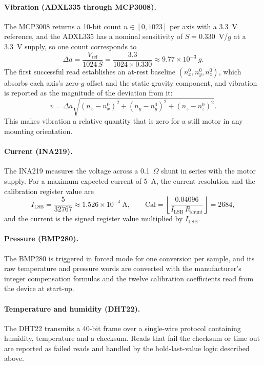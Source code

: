 \paragraph{Vibration (ADXL335 through MCP3008).} The MCP3008 returns a 10-bit count $n \in [0, 1023]$ per axis with a 3.3~V reference, and the ADXL335 has a nominal sensitivity of $S = 0.330$~V/$g$ at a 3.3~V supply, so one count corresponds to
\begin{equation}
\Delta a = \frac{V_{\mathrm{ref}}}{1024\, S} = \frac{3.3}{1024 \times 0.330} \approx 9.77 \times 10^{-3}~g.
\end{equation}
The first successful read establishes an at-rest baseline $(n_x^0, n_y^0, n_z^0)$, which absorbs each axis's zero-$g$ offset and the static gravity component, and vibration is reported as the magnitude of the deviation from it:
\begin{equation}
v = \Delta a \sqrt{(n_x - n_x^0)^2 + (n_y - n_y^0)^2 + (n_z - n_z^0)^2}.
\end{equation}
This makes vibration a relative quantity that is zero for a still motor in any mounting orientation.

\paragraph{Current (INA219).} The INA219 measures the voltage across a 0.1~$\Omega$ shunt in series with the motor supply. For a maximum expected current of 5~A, the current resolution and the calibration register value are
\begin{equation}
I_{\mathrm{LSB}} = \frac{5}{32767} \approx 1.526 \times 10^{-4}~\mathrm{A}, \qquad
\mathrm{Cal} = \left\lfloor \frac{0.04096}{I_{\mathrm{LSB}}\, R_{\mathrm{shunt}}} \right\rfloor = 2684,
\end{equation}
and the current is the signed register value multiplied by $I_{\mathrm{LSB}}$.

\paragraph{Pressure (BMP280).} The BMP280 is triggered in forced mode for one conversion per sample, and its raw temperature and pressure words are converted with the manufacturer's integer compensation formulas and the twelve calibration coefficients read from the device at start-up.

\paragraph{Temperature and humidity (DHT22).} The DHT22 transmits a 40-bit frame over a single-wire protocol containing humidity, temperature and a checksum. Reads that fail the checksum or time out are reported as failed reads and handled by the hold-last-value logic described above.

